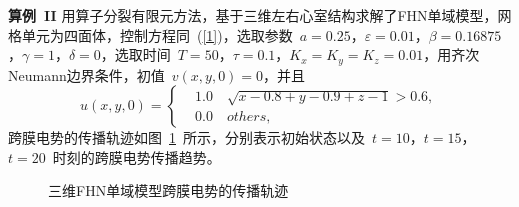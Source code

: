 \documentclass[twoside,UTF8]{nputhesis}
\begin{document}
\textbf{算例~II} 用算子分裂有限元方法，基于三维左右心室结构求解了FHN单域模型，网格单元为四面体，控制方程同~(\ref{1})，选取参数~$a=0.25$，$\varepsilon=0.01$，$\beta=0.16875$，$\gamma=1$，$\delta=0$，选取时间~$T=50$，$\tau=0.1$，$K_x=K_y=K_z=0.01$，用齐次Neumann边界条件，初值~$v(x,y,0)=0$，并且
\begin{equation*}
u(x,y,0) =\left\{\begin{aligned}&1.0 \quad\sqrt{x-0.8+y-0.9+z-1}>0.6,\\
&0.0 \quad others,\end{aligned}\right.
\end{equation*}
跨膜电势的传播轨迹如图~\ref{fig7}~所示，分别表示初始状态以及~$t=10$，$t=15$，$t=20$~时刻的跨膜电势传播趋势。
\begin{figure}[htb]
	\centering
	{	  }
	\hspace{0.2\textwidth}
	\hspace{0.2\textwidth}
	\hspace{0.2\textwidth}
	\caption{三维FHN单域模型跨膜电势的传播轨迹}
	\label{fig7}
\end{figure}
\end{document}
